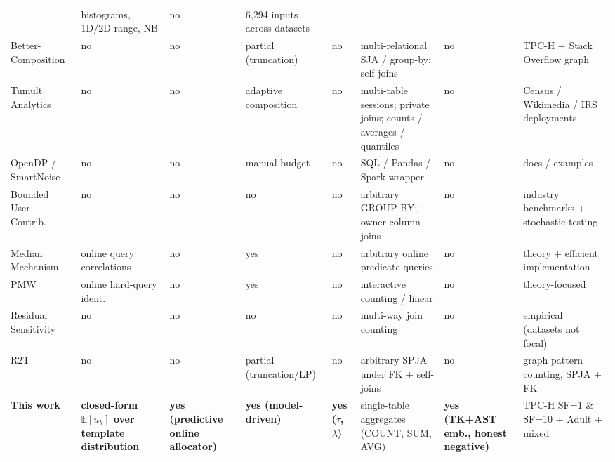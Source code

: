 \documentclass[sigconf,nonacm]{acmart}
\newcommand{\E}{\mathbb{E}}
\begin{document}
\begin{table}[t]
\begin{tabular}{p{2.5cm}|p{2.2cm}|p{1.8cm}|p{1.9cm}|p{1.4cm}|p{2.7cm}|p{1.0cm}|p{2.0cm}}
  & histograms, 1D/2D range, NB
  & no & 6{,}294 inputs across datasets \\
Better-Composition \cite{dong2023better}
  & no & no & partial (truncation) & no
  & multi-relational SJA / group-by; self-joins
  & no & TPC-H + Stack Overflow graph \\
\midrule
Tumult Analytics \cite{berghel2022tumult}
  & no & no & adaptive composition & no
  & multi-table sessions; private joins; counts / averages / quantiles
  & no & Census / Wikimedia / IRS deployments \\
OpenDP / SmartNoise \cite{opendp2023}
  & no & no & manual budget & no
  & SQL / Pandas / Spark wrapper
  & no & docs / examples \\
Bounded User Contrib.\ \cite{wilson2020bounded}
  & no & no & no & no
  & arbitrary GROUP BY; owner-column joins
  & no & industry benchmarks + stochastic testing \\
\midrule
Median Mechanism \cite{rothroughgarden2010median}
  & online query correlations & no & yes & no
  & arbitrary online predicate queries
  & no & theory + efficient implementation \\
PMW \cite{hardtrothblum2010pmw}
  & online hard-query ident.\ & no & yes & no
  & interactive counting / linear
  & no & theory-focused \\
\midrule
Residual Sensitivity \cite{dong2021residual}
  & no & no & no & no
  & multi-way join counting
  & no & empirical (datasets not focal) \\
R2T \cite{dong2022r2t}
  & no & no & partial (truncation/LP) & no
  & arbitrary SPJA under FK + self-joins
  & no & graph pattern counting, SPJA + FK \\
\midrule
\textbf{This work}
  & \textbf{closed-form $\E[u_k]$ over template distribution}
  & \textbf{yes (predictive online allocator)}
  & \textbf{yes (model-driven)}
  & \textbf{yes ($\tau$, $\lambda$)}
  & single-table aggregates (COUNT, SUM, AVG)
  & \textbf{yes (TK+AST emb., honest negative)}
  & TPC-H SF=1 \& SF=10 + Adult + mixed \\
\bottomrule
\end{tabular}
\end{table}
\end{document}
